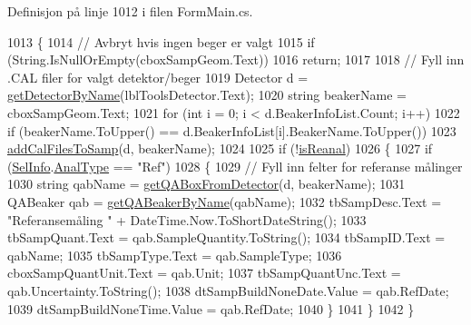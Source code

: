 Definisjon på linje 1012 i filen Form\+Main.\+cs.


\begin{DoxyCode}
1013         \{
1014             \textcolor{comment}{// Avbryt hvis ingen beger er valgt}
1015             \textcolor{keywordflow}{if} (String.IsNullOrEmpty(cboxSampGeom.Text))
1016                 \textcolor{keywordflow}{return};
1017 
1018             \textcolor{comment}{// Fyll inn .CAL filer for valgt detektor/beger}
1019             Detector d = \hyperlink{class_scintilab_1_1_form_main_aff4482e0919480013a53fe56cfb374ba}{getDetectorByName}(lblToolsDetector.Text);
1020             \textcolor{keywordtype}{string} beakerName = cboxSampGeom.Text;
1021             \textcolor{keywordflow}{for} (\textcolor{keywordtype}{int} i = 0; i < d.BeakerInfoList.Count; i++)
1022                 \textcolor{keywordflow}{if} (beakerName.ToUpper() == d.BeakerInfoList[i].BeakerName.ToUpper())
1023                     \hyperlink{class_scintilab_1_1_form_main_ab744904cac6a4bf90ebbe326b658e2e5}{addCalFilesToSamp}(d, beakerName);
1024             
1025             \textcolor{keywordflow}{if} (!\hyperlink{class_scintilab_1_1_form_main_a389e9c6697c567d84058d178053a837c}{isReanal})
1026             \{
1027                 \textcolor{keywordflow}{if} (\hyperlink{class_scintilab_1_1_form_main_a57c8340ae2caaec775ad70d8036514fb}{SelInfo}.\hyperlink{class_scintilab_1_1_selection_info_aba3d0673e0d48ee2e2320fdb18179650}{AnalType} == \textcolor{stringliteral}{"Ref"})
1028                 \{
1029                     \textcolor{comment}{// Fyll inn felter for referanse målinger}
1030                     \textcolor{keywordtype}{string} qabName = \hyperlink{class_scintilab_1_1_form_main_ad8de93638ebc50f712d85af269ba383d}{getQABoxFromDetector}(d, beakerName);
1031                     QABeaker qab = \hyperlink{class_scintilab_1_1_form_main_ae8b1f6bb6a734ec6ad54794d345ce650}{getQABeakerByName}(qabName);
1032                     tbSampDesc.Text = \textcolor{stringliteral}{"Referansemåling "} + DateTime.Now.ToShortDateString();
1033                     tbSampQuant.Text = qab.SampleQuantity.ToString();
1034                     tbSampID.Text = qabName;
1035                     tbSampType.Text = qab.SampleType;
1036                     cboxSampQuantUnit.Text = qab.Unit;
1037                     tbSampQuantUnc.Text = qab.Uncertainty.ToString();
1038                     dtSampBuildNoneDate.Value = qab.RefDate;
1039                     dtSampBuildNoneTime.Value = qab.RefDate;
1040                 \}
1041             \}
1042         \}
\end{DoxyCode}
